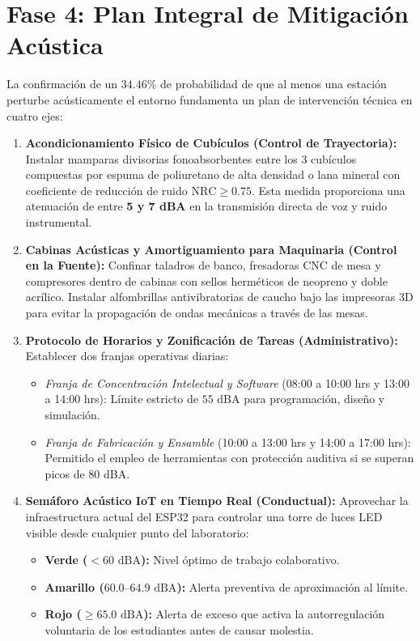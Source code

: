 \documentclass{article}
\begin{document}
\section{Fase 4: Plan Integral de Mitigación Acústica}
La confirmación de un $34.46\%$ de probabilidad de que al menos una estación perturbe acústicamente el entorno fundamenta un plan de intervención técnica en cuatro ejes:

\begin{enumerate}
    \item \textbf{Acondicionamiento Físico de Cubículos (Control de Trayectoria):}
    Instalar mamparas divisorias fonoabsorbentes entre los 3 cubículos compuestas por espuma de poliuretano de alta densidad o lana mineral con coeficiente de reducción de ruido $\text{NRC} \ge 0.75$. Esta medida proporciona una atenuación de entre \textbf{5 y 7 dBA} en la transmisión directa de voz y ruido instrumental.
    
    \item \textbf{Cabinas Acústicas y Amortiguamiento para Maquinaria (Control en la Fuente):}
    Confinar taladros de banco, fresadoras CNC de mesa y compresores dentro de cabinas con sellos herméticos de neopreno y doble acrílico. Instalar alfombrillas antivibratorias de caucho bajo las impresoras 3D para evitar la propagación de ondas mecánicas a través de las mesas.
    
    \item \textbf{Protocolo de Horarios y Zonificación de Tareas (Administrativo):}
    Establecer dos franjas operativas diarias:
    \begin{itemize}
        \item \textit{Franja de Concentración Intelectual y Software} (08:00 a 10:00 hrs y 13:00 a 14:00 hrs): Límite estricto de $55\text{ dBA}$ para programación, diseño y simulación.
        \item \textit{Franja de Fabricación y Ensamble} (10:00 a 13:00 hrs y 14:00 a 17:00 hrs): Permitido el empleo de herramientas con protección auditiva si se superan picos de 80 dBA.
    \end{itemize}
    
    \item \textbf{Semáforo Acústico IoT en Tiempo Real (Conductual):}
    Aprovechar la infraestructura actual del ESP32 para controlar una torre de luces LED visible desde cualquier punto del laboratorio:
    \begin{itemize}
        \item \textbf{Verde ($< 60\text{ dBA}$):} Nivel óptimo de trabajo colaborativo.
        \item \textbf{Amarillo ($60.0\text{--}64.9\text{ dBA}$):} Alerta preventiva de aproximación al límite.
        \item \textbf{Rojo ($\ge 65.0\text{ dBA}$):} Alerta de exceso que activa la autorregulación voluntaria de los estudiantes antes de causar molestia.
    \end{itemize}
\end{enumerate}
\end{document}
